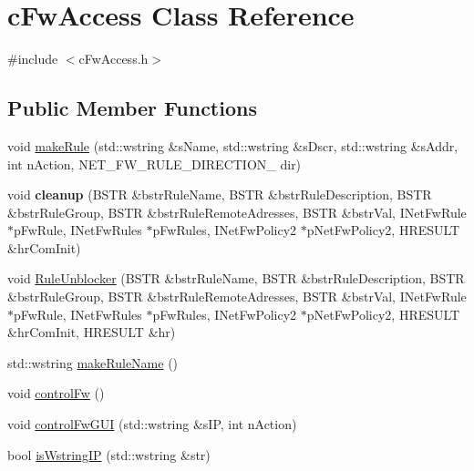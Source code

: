\hypertarget{classc_fw_access}{}\section{c\+Fw\+Access Class Reference}
\label{classc_fw_access}


{\ttfamily \#include $<$c\+Fw\+Access.\+h$>$}

\subsection*{Public Member Functions}
\begin{DoxyCompactItemize}
\item 
void \hyperlink{classc_fw_access_a08e2e69a2e96eed18f77c25819d467d4}{make\+Rule} (std\+::wstring \&s\+Name, std\+::wstring \&s\+Dscr, std\+::wstring \&s\+Addr, int n\+Action, N\+E\+T\+\_\+\+F\+W\+\_\+\+R\+U\+L\+E\+\_\+\+D\+I\+R\+E\+C\+T\+I\+O\+N\+\_\+ dir)
\item 
\hypertarget{classc_fw_access_a9eb66aa7d36c526b6617e69bead57915}{}void {\bfseries cleanup} (B\+S\+T\+R \&bstr\+Rule\+Name, B\+S\+T\+R \&bstr\+Rule\+Description, B\+S\+T\+R \&bstr\+Rule\+Group, B\+S\+T\+R \&bstr\+Rule\+Remote\+Adresses, B\+S\+T\+R \&bstr\+Val, I\+Net\+Fw\+Rule $\ast$p\+Fw\+Rule, I\+Net\+Fw\+Rules $\ast$p\+Fw\+Rules, I\+Net\+Fw\+Policy2 $\ast$p\+Net\+Fw\+Policy2, H\+R\+E\+S\+U\+L\+T \&hr\+Com\+Init)\label{classc_fw_access_a9eb66aa7d36c526b6617e69bead57915}

\item 
void \hyperlink{classc_fw_access_a26b6363cd83d1d54a318030e35552a6b}{Rule\+Unblocker} (B\+S\+T\+R \&bstr\+Rule\+Name, B\+S\+T\+R \&bstr\+Rule\+Description, B\+S\+T\+R \&bstr\+Rule\+Group, B\+S\+T\+R \&bstr\+Rule\+Remote\+Adresses, B\+S\+T\+R \&bstr\+Val, I\+Net\+Fw\+Rule $\ast$p\+Fw\+Rule, I\+Net\+Fw\+Rules $\ast$p\+Fw\+Rules, I\+Net\+Fw\+Policy2 $\ast$p\+Net\+Fw\+Policy2, H\+R\+E\+S\+U\+L\+T \&hr\+Com\+Init, H\+R\+E\+S\+U\+L\+T \&hr)
\item 
std\+::wstring \hyperlink{classc_fw_access_aefabb6d98360ce5ab95d14d2cc1bd896}{make\+Rule\+Name} ()
\item 
void \hyperlink{classc_fw_access_a6519f8ac419fcba5c037f514c2aea71b}{control\+Fw} ()
\item 
void \hyperlink{classc_fw_access_a8e969eb55aa4a9ca9af1710eb1bfb0ce}{control\+Fw\+G\+U\+I} (std\+::wstring \&s\+I\+P, int n\+Action)
\item 
bool \hyperlink{classc_fw_access_aa7b74e8ac58298c2582e3e2f5bd3265d}{is\+Wstring\+I\+P} (std\+::wstring \&str)
\end{DoxyCompactItemize}


